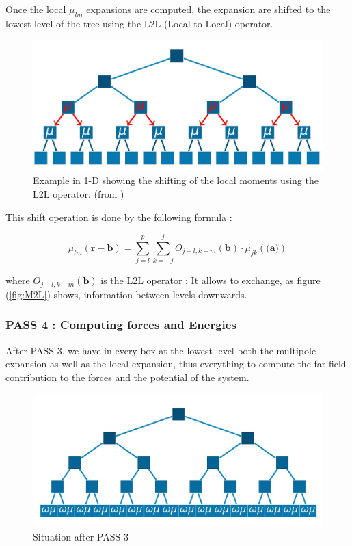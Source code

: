 \documentclass[10pt,twoside,a4paper]{report}
\begin{document}
Once the local $\mu_{lm}$ expansions are computed, the expansion are shifted to the lowest level of the tree using the L2L (Local to Local) operator.

	\begin{figure}[H]
	\label{fig:L2L}
   \includegraphics[scale=0.4]{L2L_1}
    \centering 
    \caption{Example in 1-D showing the shifting of the local moments using the L2L operator. (from \cite{phdIvo}) }
    
   \end{figure}
    
 	This shift operation is done by the following formula :
 	
 	  \begin{equation}
	  \mu_{lm}(\textbf{r} - \textbf{b}) = \sum\limits_{j = l}^{p} \sum\limits_{k=-j}^{j}
	  O_{j-l,k-m}(\textbf{b}) \cdot \mu_{jk}(\textbf{(a)})
	  \end{equation}
 
 		where $O_{j-l,k-m}(\textbf{b})$ is the L2L operator : It allows to exchange, as figure (\ref{fig:M2L}) shows, information between levels downwards.
 		
 \subsubsection{PASS 4 : Computing forces and Energies}
 
 
 After PASS 3, we have in every box at the lowest level both the multipole expansion as well as the local expansion, thus everything to compute the far-field contribution to the forces and the potential of the system. 
 
\begin{figure}[H]
	\label{fig:farfield}
   \includegraphics[scale=0.5]{farfield}
    \centering 
    \caption{Situation after PASS 3 }
    
   \end{figure} 
   
\end{document}
